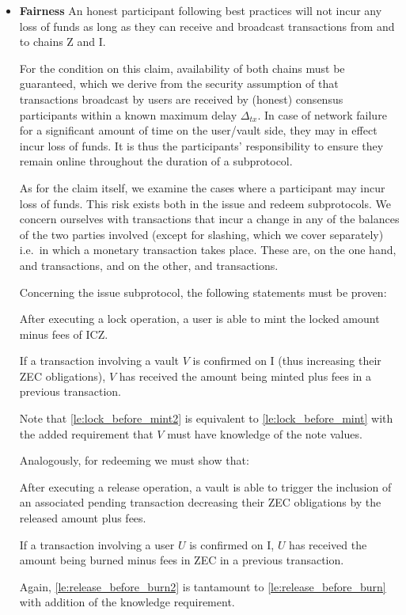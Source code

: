 \begin{itemize}
    \item \textbf{Fairness} An honest participant following best practices will not incur any loss of funds as long as they can receive and broadcast transactions from and to chains Z and I.
    
    For the condition on this claim, availability of both chains must be guaranteed, which we derive from the security assumption of \xclaim that transactions broadcast by users are received by (honest) consensus participants within a known maximum delay $\Delta_{tx}$.
    In case of network failure for a significant amount of time on the user/vault side, they may in effect incur loss of funds.
    It is thus the participants' responsibility to ensure they remain online throughout the duration of a subprotocol.

    As for the claim itself, we examine the cases where a participant may incur loss of funds.
    This risk exists both in the issue and redeem subprotocols.
    We concern ourselves with transactions that incur a change in any of the balances of the two parties involved (except for slashing, which we cover separately) i.e.\ in which a monetary transaction takes place.
    These are, on the one hand, \lock and \release transactions, and on the other, \mint and \burn transactions.
    
    Concerning the issue subprotocol, the following statements must be proven:
    \begin{lemma}\label{le:mint_after_lock}
        After executing a lock operation, a user is able to mint the locked amount minus fees of ICZ.
    \end{lemma}
    \begin{lemma}\label{le:lock_before_mint2}
        If a \mint transaction involving a vault $V$ is confirmed on I (thus increasing their ZEC obligations), $V$ has received the amount being minted plus fees in a previous \lock transaction.
    \end{lemma}
    Note that \cref{le:lock_before_mint2} is equivalent to \cref{le:lock_before_mint} with the added requirement that $V$ must have knowledge of the note values.
    
    Analogously, for redeeming we must show that:
    \begin{lemma}\label{le:burn_after_release}
        After executing a release operation, a vault is able to trigger the inclusion of an associated pending \burn transaction decreasing their ZEC obligations by the released amount plus fees.
    \end{lemma}
    \begin{lemma}\label{le:release_before_burn2}
        If a \burn transaction involving a user $U$ is confirmed on I, $U$ has received the amount being burned minus fees in ZEC in a previous \release transaction.
    \end{lemma}
    Again, \cref{le:release_before_burn2} is tantamount to \cref{le:release_before_burn} with addition of the knowledge requirement.
    

\end{itemize}
